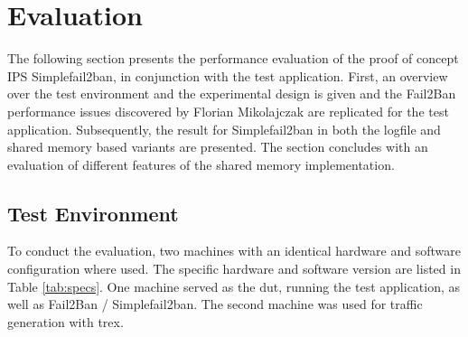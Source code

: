 
%

\chapter{Evaluation}

The following section presents the performance evaluation of the proof of concept \ac{IPS} Simplefail2ban, in conjunction
with the test application. First, an overview over the test environment and the experimental design is given and the Fail2Ban performance
issues discovered by Florian Mikolajczak are replicated for the test application. Subsequently, the result for Simplefail2ban in both the logfile
and shared memory based variants are presented. The section concludes with an evaluation of different features of the shared memory implementation. 

\section{Test Environment}

To conduct the evaluation, two machines with an identical hardware and software configuration where used. The specific hardware and software version are listed in Table \ref{tab:specs}.
One machine served as the dut, running the test application, as well as Fail2Ban / Simplefail2ban. The second machine was used for traffic generation with trex.  

